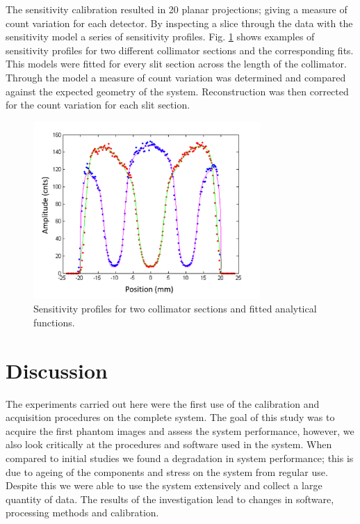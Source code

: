 The sensitivity calibration resulted in 20 planar projections; giving a measure of count variation for each detector. By inspecting a slice through the data with the sensitivity model a series of sensitivity profiles. Fig. \ref{fig_sensprof} shows examples of sensitivity profiles for two different collimator sections and the corresponding fits. This models were fitted for every slit section across the length of the collimator. Through the model a measure of count variation was determined and compared against the expected geometry of the system. Reconstruction was then corrected for the count variation for each slit section. 

\begin{figure}[!t]
\centering
\includegraphics[width=3.4in]{figures/sns_prof.png}
\caption{Sensitivity profiles for two collimator sections and fitted analytical functions.}
\label{fig_sensprof}
\end{figure}

\section{Discussion}
The experiments carried out here were the first use of the calibration and acquisition procedures on the complete system. The goal of this study was to acquire the first phantom images and assess the system performance, however, we also look critically at the procedures and software used in the system. When compared to initial studies \cite{8432104} we found a degradation in system performance; this is due to ageing of the components and stress on the system from regular use. Despite this we were able to use the system extensively and collect a large quantity of data. The results of the investigation lead to changes in software, processing methods and calibration. 


